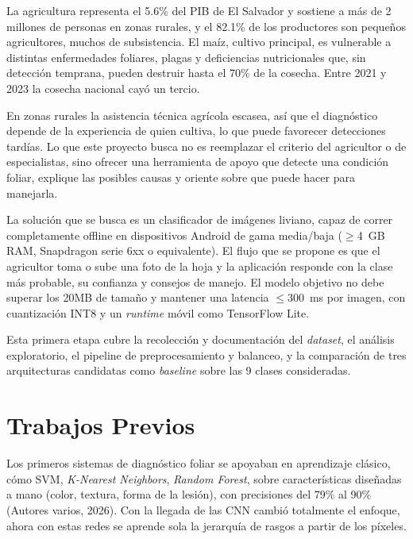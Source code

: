 \documentclass[12pt,letterpaper]{article}
\begin{document}
La agricultura representa el 5.6\% del PIB de El Salvador y sostiene a m\'as de 2 millones de personas en zonas rurales, y el 82.1\% de los productores son peque\~nos agricultores, muchos de subsistencia. El ma\'iz, cultivo principal, es vulnerable a distintas enfermedades foliares, plagas y deficiencias nutricionales que, sin detecci\'on temprana, pueden destruir hasta el 70\% de la cosecha. Entre 2021 y 2023 la cosecha nacional cay\'o un tercio.

En zonas rurales la asistencia t\'ecnica agr\'icola escasea, as\'i que el diagn\'ostico depende de la experiencia de quien cultiva, lo que puede favorecer detecciones tard\'ias. Lo que este proyecto busca no es reemplazar el criterio del agricultor o de especialistas, sino ofrecer una herramienta de apoyo que detecte una condici\'on foliar, explique las posibles causas y oriente sobre que puede hacer para manejarla.

La soluci\'on que se busca es un clasificador de im\'agenes liviano, capaz de correr completamente offline en dispositivos Android de gama media/baja (${\geq}$4~GB RAM, Snapdragon serie 6xx o equivalente). El flujo que se propone es que el agricultor toma o sube una foto de la hoja y la aplicaci\'on responde con la clase m\'as probable, su confianza y consejos de manejo. El modelo objetivo no debe superar los 20MB de tamaño y mantener una latencia ${\leq}300$~ms por imagen, con cuantizaci\'on INT8 y un \textit{runtime} m\'ovil como TensorFlow Lite.

Esta primera etapa cubre la recolecci\'on y documentaci\'on del \textit{dataset}, el an\'alisis exploratorio, el pipeline de preprocesamiento y balanceo, y la comparaci\'on de tres arquitecturas candidatas como \textit{baseline} sobre las 9 clases consideradas.

\section{Trabajos Previos}

Los primeros sistemas de diagn\'ostico foliar se apoyaban en aprendizaje cl\'asico, cómo SVM, \textit{K-Nearest Neighbors}, \textit{Random Forest}, sobre caracter\'isticas dise\~nadas a mano (color, textura, forma de la lesi\'on), con precisiones del 79\% al 90\% (Autores varios, 2026). Con la llegada de las CNN cambió totalmente el enfoque, ahora con estas redes se aprende sola la jerarqu\'ia de rasgos a partir de los p\'ixeles.
\end{document}
